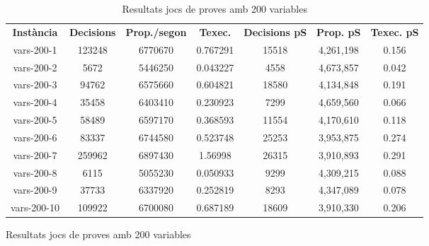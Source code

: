 \begin{figure}[H]
	\centering
	\begin{table}[H]
		\begin{tabular}{ccccccc}
			\rowcolor[HTML]{C0C0C0} 
			{\color[HTML]{000000} \textbf{Instància}} & {\color[HTML]{000000} \textbf{Decisions}} & {\color[HTML]{000000} \textbf{Prop./segon}} & {\color[HTML]{000000} \textbf{Texec.}} & {\color[HTML]{000000} \textbf{Decisions pS}}& {\color[HTML]{000000} \textbf{Prop. pS}}& {\color[HTML]{000000} \textbf{Texec. pS}} \\
			vars-200-1 & 123248 & 6770670 & 0.767291 & 15518 & 4,261,198 & 0.156\\
			vars-200-2 & 5672 & 5446250 & 0.043227 & 4558 & 4,673,857 & 0.042\\
			vars-200-3 & 94762 & 6575660 & 0.604821 & 18580 & 4,134,848 & 0.191\\
			vars-200-4 & 35458 & 6403410 & 0.230923 & 7299 & 4,659,560 & 0.066\\
			vars-200-5 & 58489 & 6597170 & 0.368593 & 11554 & 4,170,610 & 0.118\\
			vars-200-6 & 83337 & 6744580 & 0.523748 & 25253 & 3,953,875 & 0.274\\
			vars-200-7 & 259962 & 6897430 & 1.56998 & 26315 & 3,910,893 & 0.291\\
			vars-200-8 & 6115 & 5055230 & 0.050933 & 9299 & 4,309,215 & 0.088\\
			vars-200-9 & 37733 & 6337920 & 0.252819 & 8293 & 4,347,089 & 0.078\\
			vars-200-10 & 109922 & 6700080 & 0.687189 & 18609 & 3,910,330 & 0.206\\                                              
		\end{tabular}
			\caption{Resultats jocs de proves amb 200 variables}
	\end{table}

	\label{fig:my_label3}
\end{figure}


